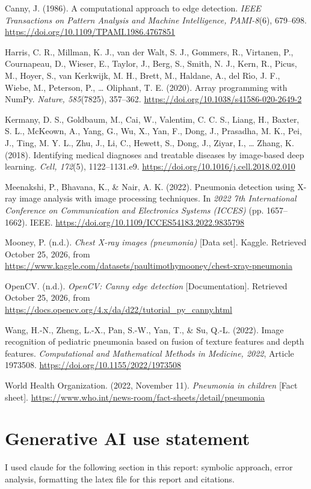 \documentclass[11pt,letterpaper]{article}
\begin{document}
\begin{list}{}{\setlength{\leftmargin}{18pt}\setlength{\itemindent}{-18pt}\setlength{\itemsep}{3pt}\setlength{\parsep}{0pt}\setlength{\topsep}{0pt}}
\item Canny, J. (1986). A computational approach to edge detection. \textit{IEEE Transactions on Pattern Analysis and Machine Intelligence, PAMI-8}(6), 679--698. \url{https://doi.org/10.1109/TPAMI.1986.4767851}

\item Harris, C. R., Millman, K. J., van der Walt, S. J., Gommers, R., Virtanen, P., Cournapeau, D., Wieser, E., Taylor, J., Berg, S., Smith, N. J., Kern, R., Picus, M., Hoyer, S., van Kerkwijk, M. H., Brett, M., Haldane, A., del R\'{\i}o, J. F., Wiebe, M., Peterson, P., \ldots{} Oliphant, T. E. (2020). Array programming with NumPy. \textit{Nature, 585}(7825), 357--362. \url{https://doi.org/10.1038/s41586-020-2649-2}

\item Kermany, D. S., Goldbaum, M., Cai, W., Valentim, C. C. S., Liang, H., Baxter, S. L., McKeown, A., Yang, G., Wu, X., Yan, F., Dong, J., Prasadha, M. K., Pei, J., Ting, M. Y. L., Zhu, J., Li, C., Hewett, S., Dong, J., Ziyar, I., \ldots{} Zhang, K. (2018). Identifying medical diagnoses and treatable diseases by image-based deep learning. \textit{Cell, 172}(5), 1122--1131.e9. \url{https://doi.org/10.1016/j.cell.2018.02.010}

\item Meenakshi, P., Bhavana, K., \& Nair, A. K. (2022). Pneumonia detection using X-ray image analysis with image processing techniques. In \textit{2022 7th International Conference on Communication and Electronics Systems (ICCES)} (pp. 1657--1662). IEEE. \url{https://doi.org/10.1109/ICCES54183.2022.9835798}

\item Mooney, P. (n.d.). \textit{Chest X-ray images (pneumonia)} [Data set]. Kaggle. Retrieved October 25, 2026, from \url{https://www.kaggle.com/datasets/paultimothymooney/chest-xray-pneumonia}

\item OpenCV. (n.d.). \textit{OpenCV: Canny edge detection} [Documentation]. Retrieved October 25, 2026, from \url{https://docs.opencv.org/4.x/da/d22/tutorial_py_canny.html}

\item Wang, H.-N., Zheng, L.-X., Pan, S.-W., Yan, T., \& Su, Q.-L. (2022). Image recognition of pediatric pneumonia based on fusion of texture features and depth features. \textit{Computational and Mathematical Methods in Medicine, 2022}, Article 1973508. \url{https://doi.org/10.1155/2022/1973508}

\item World Health Organization. (2022, November 11). \textit{Pneumonia in children} [Fact sheet]. \url{https://www.who.int/news-room/fact-sheets/detail/pneumonia}
\end{list}

\section{Generative AI use statement}

I used claude for the following section in this report: symbolic approach, error analysis, formatting the latex file for this report and citations.
\end{document}
